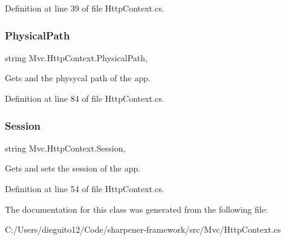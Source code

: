 Definition at line 39 of file Http\+Context.\+cs.

\mbox{\label{class_mvc_1_1_http_context_afbc78dfac5e1f0097c1a2cf8b9ed63ca}} 
\subsubsection{\texorpdfstring{Physical\+Path}{PhysicalPath}}
{\footnotesize\ttfamily string Mvc.\+Http\+Context.\+Physical\+Path\hspace{0.3cm}{\ttfamily [get]}, {\ttfamily [set]}}



Gets and the physycal path of the app. 



Definition at line 84 of file Http\+Context.\+cs.

\mbox{\label{class_mvc_1_1_http_context_a467051f9750430b364e63069a2327b70}} 
\subsubsection{\texorpdfstring{Session}{Session}}
{\footnotesize\ttfamily string Mvc.\+Http\+Context.\+Session\hspace{0.3cm}{\ttfamily [get]}, {\ttfamily [set]}}



Gets and sets the session of the app. 



Definition at line 54 of file Http\+Context.\+cs.



The documentation for this class was generated from the following file\+:\begin{DoxyCompactItemize}
\item 
C\+:/\+Users/dieguito12/\+Code/sharpener-\/framework/src/\+Mvc/Http\+Context.\+cs\end{DoxyCompactItemize}
